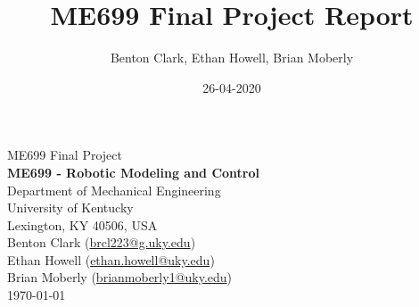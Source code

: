\documentclass[10pt]{article}
\title{ME699 Final Project Report}
\date{26-04-2020}
\author{Benton Clark, Ethan Howell, Brian Moberly}
\numberwithin{table}{section}
\numberwithin{figure}{section}
\numberwithin{equation}{section}
\renewcommand{\headrulewidth}{0pt}
\renewcommand{\footrulewidth}{0pt}
\begin{document}
	\thispagestyle{fancy}
	\begin{titlepage}
		\thispagestyle{fancy}
		\begin{center}
			\vspace*{2.5cm}
			{\LARGE ME699 Final Project}\\
			\vspace*{1.25cm}
			\textbf{ME699 - Robotic Modeling and Control}\\
			Department of Mechanical Engineering\\
			University of Kentucky\\
			Lexington, KY 40506, USA\\
			\vspace*{0.75cm}
			Benton Clark (\href{brcl223@g.uky.edu}{brcl223@g.uky.edu})\\
			Ethan Howell (\href{ethan.howell@uky.edu}{ethan.howell@uky.edu})\\
			Brian Moberly (\href{brianmoberly1@uky.edu}{brianmoberly1@uky.edu})\\
			\vspace*{0.75cm}
			\today
		\end{center}
	\end{titlepage}
	\rhead{\rightmark}
	\newpage
	\setcounter{page}{1}
	\cfoot{\thepage}
	\renewcommand{\sectionmark}[1]{\markright{\arabic{section}.\ #1}}
	\pagestyle{fancy}
	\renewcommand{\headrulewidth}{2pt}
	\renewcommand{\footrulewidth}{1pt}
	
	\cleardoublepage
	\renewcommand*{\contentsname}{Table of Contents}
	\tableofcontents
	\newpage
	\listoffigures
	\newpage
	\setcounter{page}{1}
	\newpage

	
	
	
	
	
	\newpage
	\printbibliography[heading=bibintoc,title=Works Cited]
\end{document}
